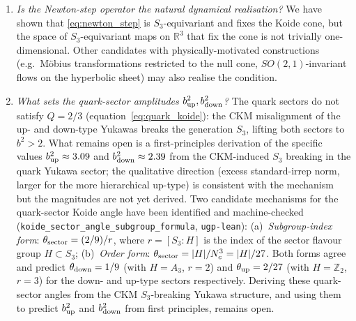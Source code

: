 \documentclass[11pt]{article}
\theoremstyle{remark}
\begin{document}
\begin{enumerate}[leftmargin=1.3em,itemsep=0.1em]
  \item \emph{Is the Newton-step operator the natural dynamical realisation?}  We have shown that \eqref{eq:newton_step} is $S_3$-equivariant and fixes the Koide cone, but the space of $S_3$-equivariant maps on $\mathbb{R}^3$ that fix the cone is not trivially one-dimensional.  Other candidates with physically-motivated constructions (e.g.\ Möbius transformations restricted to the null cone, $SO(2,1)$-invariant flows on the hyperbolic sheet) may also realise the condition.

  \item \emph{What sets the quark-sector amplitudes $b^2_{\rm up}, b^2_{\rm down}$?}  The quark sectors do not satisfy $Q = 2/3$ (equation~\eqref{eq:quark_koide}): the CKM misalignment of the up- and down-type Yukawas breaks the generation $S_3$, lifting both sectors to $b^2 > 2$.  What remains open is a first-principles derivation of the specific values $b^2_{\rm up} \approx 3.09$ and $b^2_{\rm down} \approx 2.39$ from the CKM-induced $S_3$ breaking in the quark Yukawa sector; the qualitative direction (excess standard-irrep norm, larger for the more hierarchical up-type) is consistent with the mechanism but the magnitudes are not yet derived.
  Two candidate mechanisms for the quark-sector Koide angle have been identified and machine-checked (\texttt{koide\_sector\_angle\_subgroup\_formula}, \texttt{ugp-lean}):
  (a)~\emph{Subgroup-index form}: $\theta_{\rm sector} = (2/9)/r$, where $r = [S_3 : H]$ is the index of the sector flavour group $H \subset S_3$;
  (b)~\emph{Order form}: $\theta_{\rm sector} = |H|/N_c^3 = |H|/27$.
  Both forms agree and predict $\theta_{\rm down} = 1/9$ (with $H = A_3$, $r = 2$) and $\theta_{\rm up} = 2/27$ (with $H = \mathbb{Z}_2$, $r = 3$) for the down- and up-type sectors respectively.
  Deriving these quark-sector angles from the CKM $S_3$-breaking Yukawa structure, and using them to predict $b^2_{\rm up}$ and $b^2_{\rm down}$ from first principles, remains open.
\end{enumerate}
\end{document}
